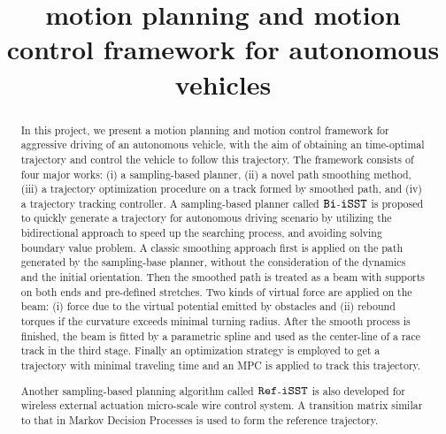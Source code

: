\documentclass[conference, onecolumn]{IEEEtran}
\begin{document}
	\title{motion planning and motion control framework for autonomous vehicles}
	\maketitle{}

\begin{abstract}
	In this project, we present a motion planning and motion control framework for aggressive driving of an autonomous vehicle, with the aim of obtaining an time-optimal trajectory and control the vehicle to follow this trajectory. The framework consists of four major works: (i) a sampling-based planner, (ii) a novel path smoothing method, (iii) a trajectory optimization procedure on a track formed by smoothed path, and (iv) a trajectory tracking controller. A sampling-based planner called $\tt Bi$-$\tt iSST$ is proposed to quickly generate a trajectory for autonomous driving scenario by utilizing the bidirectional approach to speed up the searching process, and avoiding solving boundary value problem. A classic smoothing approach first is applied on the path generated by the sampling-base planner, without the consideration of the dynamics and the initial orientation. Then the smoothed path is treated as a beam with supports on both ends and pre-defined stretches. Two kinds of virtual force are applied on the beam: (i) force due to the virtual potential emitted by obstacles and (ii) rebound torques if the curvature exceeds minimal turning radius. After the smooth process is finished, the beam is fitted by a parametric spline and used as the center-line of a race track in the third stage. Finally an optimization strategy is employed to get a trajectory with minimal traveling time and an MPC is applied to track this trajectory. 
	
	Another sampling-based planning algorithm called $\tt Ref$-$\tt iSST$ is also developed for wireless external actuation micro-scale wire control system. A transition matrix similar to that in Markov Decision Processes is used to form the reference trajectory.
\end{abstract}
\end{document}
